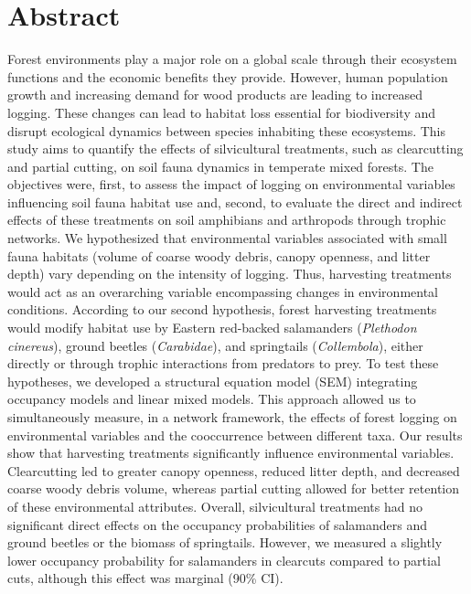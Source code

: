 \chapter*{Abstract}             %
\label{chap-abstract}           %

Forest environments play a major role on a global scale through their ecosystem functions and the economic benefits they provide. 
However, human population growth and increasing demand for wood products are leading to increased logging. 
These changes can lead to habitat loss essential for biodiversity and disrupt ecological dynamics between species inhabiting these ecosystems. 
This study aims to quantify the effects of silvicultural treatments, such as clearcutting and partial cutting, on soil fauna dynamics in temperate mixed forests. 
The objectives were, first, to assess the impact of logging on environmental variables influencing soil fauna habitat use and, second, 
to evaluate the direct and indirect effects of these treatments on soil amphibians and arthropods through trophic networks. 
We hypothesized that environmental variables associated with small fauna habitats (volume of coarse woody debris, canopy openness, and litter depth) vary depending on the intensity of logging. 
Thus, harvesting treatments would act as an overarching variable encompassing changes in environmental conditions. 
According to our second hypothesis, forest harvesting treatments would modify habitat use by Eastern red-backed salamanders (\textit{Plethodon cinereus}), ground beetles (\textit{Carabidae}), and springtails (\textit{Collembola}), 
either directly or through trophic interactions from predators to prey. 
To test these hypotheses, we developed a structural equation model (SEM) integrating occupancy models and linear mixed models. 
This approach allowed us to simultaneously measure, in a network framework, the effects of forest logging on environmental variables and the cooccurrence between different taxa. 
Our results show that harvesting treatments significantly influence environmental variables. 
Clearcutting led to greater canopy openness, reduced litter depth, and decreased coarse woody debris volume,  
whereas partial cutting allowed for better retention of these environmental attributes. 
Overall, silvicultural treatments had no significant direct effects on the occupancy probabilities of salamanders and ground beetles or the biomass of springtails. 
However, we measured a slightly lower occupancy probability for salamanders in clearcuts compared to partial cuts, although this effect was marginal (90\% CI). 
